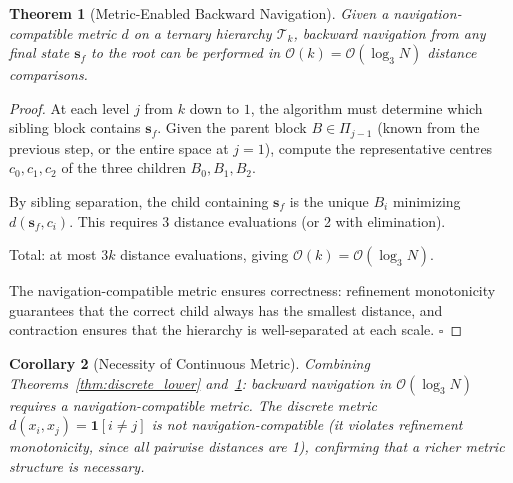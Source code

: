 \documentclass[12pt,twocolumn]{article}
\newtheorem{theorem}{Theorem}[section]
\newtheorem{corollary}[theorem]{Corollary}
\begin{document}
\begin{theorem}[Metric-Enabled Backward Navigation]
\label{thm:metric_nav}
Given a navigation-compatible metric $d$ on a ternary hierarchy $\mathcal{T}_k$, backward navigation from any final state $\mathbf{s}_f$ to the root can be performed in $\mathcal{O}(k) = \mathcal{O}(\log_3 N)$ distance comparisons.
\end{theorem}

\begin{proof}
At each level $j$ from $k$ down to $1$, the algorithm must determine which sibling block contains $\mathbf{s}_f$. Given the parent block $B \in \Pi_{j-1}$ (known from the previous step, or the entire space at $j=1$), compute the representative centres $c_0, c_1, c_2$ of the three children $B_0, B_1, B_2$.

By sibling separation, the child containing $\mathbf{s}_f$ is the unique $B_i$ minimizing $d(\mathbf{s}_f, c_i)$. This requires 3 distance evaluations (or 2 with elimination).

Total: at most $3k$ distance evaluations, giving $\mathcal{O}(k) = \mathcal{O}(\log_3 N)$.

The navigation-compatible metric ensures correctness: refinement monotonicity guarantees that the correct child always has the smallest distance, and contraction ensures that the hierarchy is well-separated at each scale. $\square$
\end{proof}

\begin{corollary}[Necessity of Continuous Metric]
\label{cor:necessity}
Combining Theorems~\ref{thm:discrete_lower} and~\ref{thm:metric_nav}: backward navigation in $\mathcal{O}(\log_3 N)$ requires a navigation-compatible metric. The discrete metric $d(x_i, x_j) = \mathbf{1}[i \neq j]$ is not navigation-compatible (it violates refinement monotonicity, since all pairwise distances are 1), confirming that a richer metric structure is necessary.
\end{corollary}
\end{document}
